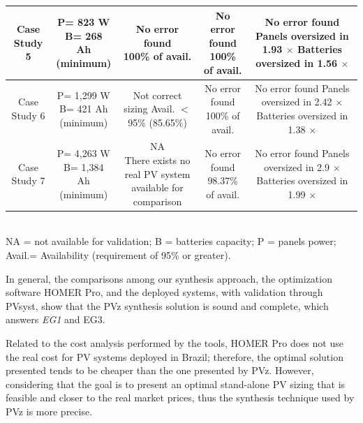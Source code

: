 \documentclass[journal]{IEEEtran}
\begin{document}
\begin{table}
\begin{scriptsize}
\begin{tabular}{c|c|c|c|c}
\hline
Case Study 5 & \makecell{P= 823 W\\B= 268 Ah\\(minimum)} & \makecell{No error found \\100\% of avail.} & \makecell{No error found \\100\% of avail.} & \makecell{No error found\\Panels oversized in 1.93 $\times$\\Batteries oversized in 1.56 $\times$}\\
\hline
Case Study 6 & \makecell{P= 1,299 W\\B= 421 Ah\\(minimum)} & \makecell{Not correct sizing \\Avail. $<$ 95\%\\(85.65\%)} & \makecell{No error found \\100\% of avail.} & \makecell{No error found\\Panels oversized in 2.42 $\times$\\Batteries oversized in 1.38 $\times$}\\
\hline
Case Study 7 & \makecell{P= 4,263 W\\B= 1,384 Ah\\(minimum)} & \makecell{NA\\There exists no real PV system\\available for comparison} & \makecell{No error found \\98.37\% of avail.} & \makecell{No error found\\Panels oversized in 2.9 $\times$\\Batteries oversized in 1.99 $\times$}\\
\hline
\hline
\end{tabular}
\\NA = not available for validation; B = batteries capacity; P = panels power; Avail.= Availability (requirement of 95\% or greater).
\end{scriptsize}
\end{table}

In general, the comparisons among our synthesis approach, the optimization software HOMER Pro, and the deployed systems, with validation through PVsyst, show that the PVz synthesis solution is sound and complete, which answers \textit{EG1} and {EG3}.

Related to the cost analysis performed by the tools, HOMER Pro does not use the real cost for PV systems deployed in Brazil; therefore, the optimal solution presented tends to be cheaper than the one presented by PVz. However, considering that the goal is to present an optimal stand-alone PV sizing that is feasible and closer to the real market prices, thus the synthesis technique used by PVz is more precise.
\end{document}
